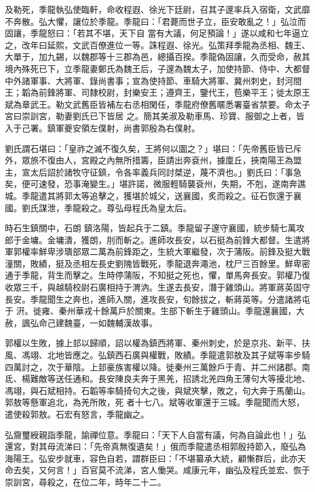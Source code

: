 \begin{pinyinscope}
 及勒死，季龍執弘使臨軒，命收程遐、徐光下廷尉，召其子邃率兵入宿衛，文武靡不奔散。弘大懼，讓位於季龍。季龍曰：「君薨而世子立，臣安敢亂之！」弘泣而固讓，季龍怒曰：「若其不堪，天下自
 當有大議，何足預論！」遂以咸和七年逼立之，改年曰延熙，文武百僚進位一等。誅程遐、徐光。弘策拜季龍為丞相、魏王、大單于，加九錫，以魏郡等十三郡為邑，總攝百揆。季龍偽固讓，久而受命，赦其境內殊死已下，立季龍妻鄭氏為魏王后，子邃為魏太子，加使持節、侍中、大都督中外諸軍事、大將軍、錄尚書事；宣為使持節、車騎大將軍、冀州刺史，封河間王；韜為前鋒將軍、司隸校尉，封樂安王；遵齊王，鑒代王，苞樂平王；徙太原王斌為章武王。勒文武舊臣皆補左右丞相閑任，季龍府僚舊暱悉署臺省禁要。命太子宮曰崇訓宮，勒妻劉氏已下皆居
 之。簡其美淑及勒車馬、珍寶、服御之上者，皆入于己署。鎮軍夔安領左僕射，尚書郭殷為右僕射。



 劉氏謂石堪曰：「皇祚之滅不復久矣，王將何以圖之？」堪曰：「先帝舊臣皆已斥外，眾旅不復由人，宮殿之內無所措籌，臣請出奔袞州，據廩丘，挾南陽王為盟主，宣太后詔於諸牧守征鎮，令各率義兵同討桀逆，蔑不濟也。」劉氏曰：「事急矣，便可速發，恐事淹變生。」堪許諾，微服輕騎襲袞州，失期，不剋，遂南奔譙城。季龍遣其將郭太等追擊之，獲堪於城父，送襄國，炙而殺之。征石恢還于襄國。劉氏謀泄，季龍殺之。尊弘母程氏為皇太后。



 時石生鎮關中，石朗
 鎮洛陽，皆起兵于二鎮。季龍留子邃守襄國，統步騎七萬攻郎于金墉。金墉潰，獲朗，刖而斬之。進師攻長安，以石挺為前鋒大都督。生遣將軍郭權率鮮卑涉璝部眾二萬為前鋒距之，生統大軍繼發，次于蒲阪。前鋒及挺大戰潼關，敗績，挺及丞相左長史劉隗皆戰死，季龍退奔澠池，枕尸三百餘里。鮮卑密通于季龍，背生而擊之。生時停蒲阪，不知挺之死也，懼，單馬奔長安。郭權乃復收眾三千，與越騎校尉石廣相持于渭汭。生遂去長安，潛于雞頭山。將軍蔣英固守長安。季龍聞生之奔也，進師入關，進攻長安，旬餘拔之，斬蔣英等。分遣諸將屯于
 汧。徙雍、秦州華戎十餘萬戶於關東。生部下斬生于雞頭山。季龍還襄國，大赦，諷弘命己建魏臺，一如魏輔漢故事。



 郭權以生敗，據上邽以歸順，詔以權為鎮西將軍、秦州刺史，於是京兆、新平、扶風、馮翊、北地皆應之。弘鎮西石廣與權戰，敗績。季龍遣郭敖及其子斌等率步騎四萬討之，次于華陰。上邽豪族害權以降。徙秦州三萬餘戶于青、并二州諸郡。南氐、楊難敵等送任通和。長安陳良夫奔于黑羌，招誘北羌四角王薄句大等擾北地、馮翊，與石斌相持。石韜等率騎掎句大之後，與斌夾擊，敗之，句大奔于馬蘭山。郭敖等懸軍追北，為羌所敗，死
 者十七八。斌等收軍還于三城。季龍聞而大怒，遣使殺郭敖。石宏有怒言，季龍幽之。



 弘齎璽綬親詣季龍，諭禪位意。季龍曰：「天下人自當有議，何為自論此也！」弘還宮，對其母流涕曰：「先帝真無復遺矣！」俄而季龍遣丞相郭殷持節入，廢弘為海陽王。弘安步就車，容色自若，謂群臣曰：「不堪纂承大統，顧慚群后，此亦天命去矣，又何言！」百官莫不流涕，宮人慟哭。咸康元年，幽弘及程氏並宏、恢于崇訓宮，尋殺之，在位二年，時年二十二。




\end{pinyinscope}
